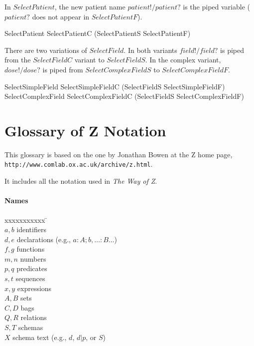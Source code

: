 \documentclass{article}
\begin{document}
In $SelectPatient$, the new patient name $patient!/patient?$ is the
piped variable ($patient?$ does not appear in $SelectPatientF$).

\begin{zed} 
SelectPatient  SelectPatientC \pipe (SelectPatientS \land SelectPatientF)
\end{zed}
There are two variations of 
$SelectField$.  In both variants $field!/field?$ is piped from 
the $SelectFieldC$ variant to $SelectFieldS$.  In the complex variant,
$dose!/dose?$ is piped from $SelectComplexFieldS$ to $SelectComplexFieldF$.

\begin{zed} 
	SelectSimpleField  SelectSimpleFieldC \pipe (SelectFieldS \land SelectSimpleFieldF)
\also
	SelectComplexField  SelectComplexFieldC \pipe (SelectFieldS \land SelectComplexFieldF)
\end{zed}












\section*{Glossary of Z Notation} \label{app:gloss}

This glossary is based on the one by Jonathan Bowen at the Z home page, \\
{\tt http://www.comlab.ox.ac.uk/archive/z.html}.  

It includes all the notation used in {\em The Way of Z}.

\paragraph{Names}

\begin{tabbing}
xxxxxxxxxxx \= \kill \\ 
$a,b$ \> identifiers \\
$d,e$ \> declarations (e.g., $a: A; b, \dots: B \dots$) \\
$f,g$ \> functions \\
$m,n$ \> numbers \\
$p,q$ \> predicates \\
$s,t$ \> sequences \\
$x,y$ \> expressions \\
$A,B$ \> sets \\
$C,D$ \> bags \\
$Q,R$ \> relations \\
$S,T$ \> schemas \\
$X$ \> schema text (e.g., $d$, $d | p$, or $S$) \\
\end{tabbing}
\end{document}
